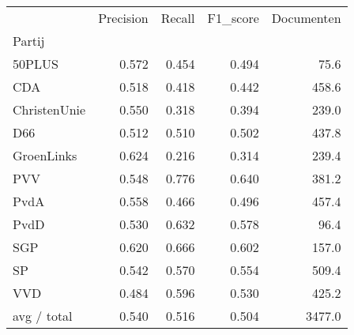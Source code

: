 \begin{tabular}{lrrrr}
\toprule
{} &  Precision &  Recall &  F1\_score &  Documenten \\
Partij       &            &         &           &             \\
\midrule
50PLUS       &      0.572 &   0.454 &     0.494 &        75.6 \\
   CDA       &      0.518 &   0.418 &     0.442 &       458.6 \\
ChristenUnie &      0.550 &   0.318 &     0.394 &       239.0 \\
   D66       &      0.512 &   0.510 &     0.502 &       437.8 \\
  GroenLinks &      0.624 &   0.216 &     0.314 &       239.4 \\
   PVV       &      0.548 &   0.776 &     0.640 &       381.2 \\
  PvdA       &      0.558 &   0.466 &     0.496 &       457.4 \\
  PvdD       &      0.530 &   0.632 &     0.578 &        96.4 \\
   SGP       &      0.620 &   0.666 &     0.602 &       157.0 \\
    SP       &      0.542 &   0.570 &     0.554 &       509.4 \\
   VVD       &      0.484 &   0.596 &     0.530 &       425.2 \\
 avg / total &      0.540 &   0.516 &     0.504 &      3477.0 \\
\bottomrule
\end{tabular}
